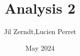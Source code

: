 \documentclass[a4paper, fontsize = 8pt, landscape]{scrartcl}
\title{Analysis 2}
\author{Jil Zerndt,Lucien Perret}
\date{May 2024}
\begin{document}
\begin{multicols}{3}
	\thispagestyle{TitlePageStyle}
	\maketitle
	\raggedcolumns
	
	\raggedcolumns
	
	\raggedcolumns
	
	\raggedcolumns
	
\end{multicols}
\end{document}
